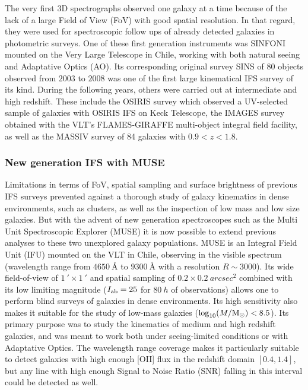 The very first 3D spectrographs observed one galaxy at a time because of the lack of a large Field of View (FoV) with good spatial resolution. In that regard, they were used for spectroscopic follow ups of already detected galaxies in photometric surveys. One of these first generation instruments was SINFONI  mounted on the Very Large Telescope in Chile, working with both natural seeing and Adaptative Optics (AO). Its corresponding original survey SINS  of $80$ objects observed from $2003$ to $2008$ was one of the first large kinematical IFS survey of its kind. During the following years, others were carried out at intermediate and high redshift. These include the OSIRIS survey  which observed a UV-selected sample of galaxies with OSIRIS IFS on Keck Telescope, the IMAGES survey  obtained with the VLT's FLAMES-GIRAFFE multi-object integral field facility, as well as the MASSIV survey  of 84 galaxies with $0.9 < z < 1.8$.


\subsubsection{New generation IFS with MUSE}

Limitations in terms of FoV, spatial sampling and surface brightness of previous IFS surveys prevented against a thorough study of galaxy kinematics in dense environments, such as clusters, as well as the inspection of low mass and low size galaxies. But with the advent of new generation spectroscopes such as the Multi Unit Spectroscopic Explorer (MUSE)  it is now possible to extend previous analyses to these two unexplored galaxy populations. MUSE is an Integral Field Unit (IFU) mounted on the VLT in Chile, observing in the visible spectrum (wavelength range from $\SI{4650}{\angstrom}$ to $\SI{9300}{\angstrom}$ with a resolution $R \sim 3000$). Its wide field-of-view of $\SI{1}{\arcmin} \times \SI{1}{\arcmin}$ and spatial sampling of $0.2 \times \SI{0.2}{arcsec^2}$ combined with its low limiting magnitude ($I_{\rm{ab}} = 25$ for $\SI{80}{h}$ of observations) allows one to perform blind surveys of galaxies in dense environments. Its high sensitivity also makes it suitable for the study of low-mass galaxies ($\log_{10} (M / \rm{M_{\odot}}) < 8.5$). Its primary purpose was to study the kinematics of medium and high redshift galaxies, and was meant to work both under seeing-limited conditions or with Adaptative Optics. The wavelength range coverage makes it particularly suitable to detect galaxies with high enough [OII] flux in the redshift domain $[0.4 , 1.4]$, but any line with high enough Signal to Noise Ratio (SNR) falling in this interval could be detected as well.